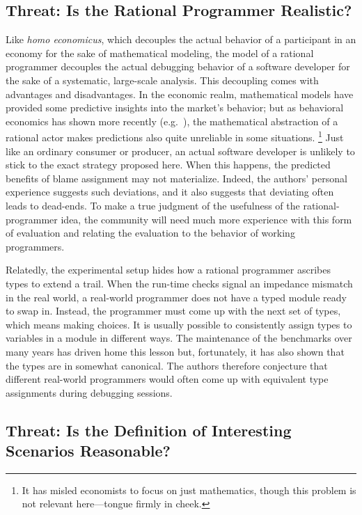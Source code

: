 \subsection{Threat: Is the Rational Programmer Realistic?}

Like {\em homo economicus\/}, which decouples the actual behavior of a
participant in an economy for the sake of mathematical modeling, the model of a
rational programmer decouples the actual debugging behavior of a software
developer for the sake of a systematic, large-scale analysis. This decoupling
comes with advantages and disadvantages. In the economic realm, mathematical
models have provided some predictive insights into the market's behavior; but as
behavioral economics has shown more recently (e.g.~\cite{henrich2001search}),
the mathematical abstraction of a
rational actor makes predictions also quite unreliable in some situations.
\footnote{It has misled economists to focus on just mathematics, though
this problem is not relevant here---tongue firmly in cheek.}  Just like an
ordinary consumer or producer, an actual software developer is unlikely to stick
to the exact strategy proposed here. When this happens, the predicted benefits
of blame assignment may not materialize. Indeed, the authors' personal
experience suggests such deviations, and it also suggests that deviating often leads to dead-ends.
To make a true judgment of the usefulness of the rational-programmer
idea, the community will need much more experience with this form of evaluation
and relating the evaluation to the behavior of working programmers.

Relatedly, the experimental setup hides how a rational programmer ascribes types
to extend a trail. When the run-time checks signal an impedance mismatch in the
real world, a real-world programmer does not have a typed module ready to swap
in. Instead, the programmer must come up with the next set of types, which means
making choices. It is usually possible to consistently assign types to variables
in a module in different ways. The maintenance of the benchmarks over many years
has driven home this lesson but, fortunately, it has also shown that the types
are in somewhat canonical.  The authors therefore conjecture that different
real-world programmers would often come up with equivalent type assignments
during debugging sessions. 

\subsection{Threat: Is the Definition of Interesting Scenarios Reasonable?} \label{sec:threat:erasure-bias}

